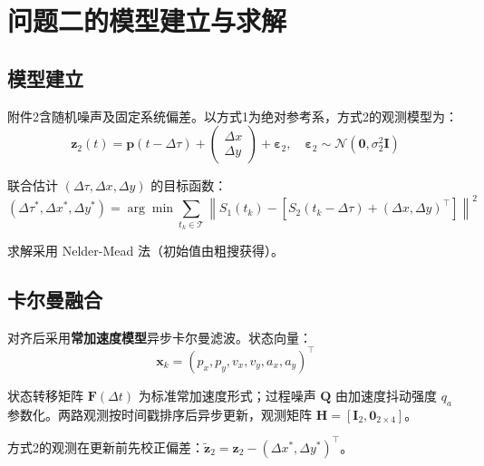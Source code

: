 \section{问题二的模型建立与求解}\label{sec:model2}

\subsection{模型建立}

附件2含随机噪声及固定系统偏差。以方式1为绝对参考系，方式2的观测模型为：
\begin{equation}
    \boldsymbol{z}_2(t) = \boldsymbol{p}(t - \Delta\tau) + \begin{pmatrix} \Delta x \\ \Delta y \end{pmatrix} + \boldsymbol{\varepsilon}_2, \quad \boldsymbol{\varepsilon}_2 \sim \mathcal{N}(\boldsymbol{0}, \sigma_2^2 \boldsymbol{I})
\end{equation}

联合估计 $(\Delta\tau, \Delta x, \Delta y)$ 的目标函数：
\begin{equation}
    (\Delta\tau^*, \Delta x^*, \Delta y^*) = \arg\min \sum_{t_k \in \mathcal{T}} \left\| S_1(t_k) - \left[ S_2(t_k - \Delta\tau) + (\Delta x, \Delta y)^\top \right] \right\|^2
    \label{eq:p2_joint}
\end{equation}

求解采用 Nelder-Mead 法（初始值由粗搜获得）。

\subsection{卡尔曼融合}

对齐后采用\textbf{常加速度模型}异步卡尔曼滤波。状态向量：
\begin{equation}
    \boldsymbol{x}_k = (p_x, p_y, v_x, v_y, a_x, a_y)^\top
\end{equation}

状态转移矩阵 $\boldsymbol{F}(\Delta t)$ 为标准常加速度形式；过程噪声 $\boldsymbol{Q}$ 由加速度抖动强度 $q_a$ 参数化。两路观测按时间戳排序后异步更新，观测矩阵 $\boldsymbol{H} = [\boldsymbol{I}_2, \boldsymbol{0}_{2\times 4}]$。

方式2的观测在更新前先校正偏差：$\tilde{\boldsymbol{z}}_2 = \boldsymbol{z}_2 - (\Delta x^*, \Delta y^*)^\top$。

